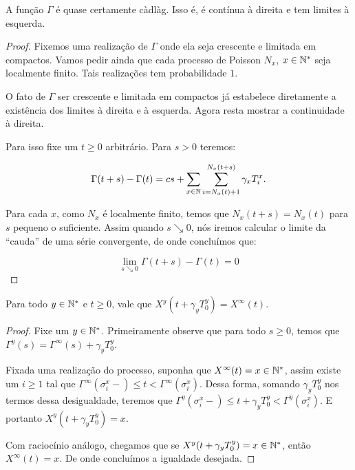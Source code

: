 \begin{proposicao}
  \label{prop:gamma-cadlag}
  A função $\Gamma$ é quase certamente càdlàg. Isso é, é contínua à
  direita e tem limites à esquerda.
\end{proposicao}
\begin{proof}

  Fixemos uma realização de $\Gamma$ onde ela seja crescente e
  limitada em compactos. Vamos pedir ainda que cada processo de
  Poisson $N_x$, $x \in {\mathbb{N^*}}$ seja localmente finito. Tais realizações
  tem probabilidade $1$.

  O fato de $\Gamma$ ser crescente e limitada em compactos já
  estabelece diretamente a existência dos limites à direita e à
  esquerda. Agora resta mostrar a continuidade à direita.

  Para isso fixe um $t \geq 0$ arbitrário. Para $s > 0$ teremos:

  \begin{equation*}
    \Gamma(t+s) - \Gamma(t) = 
    c s + 
    \sum_{x \in {\mathbb{N}}} \sum_{i = N_x(t)+1}^{N_x(t+s)} \gamma_x T^x_i.
  \end{equation*}

  Para cada $x$, como $N_x$ é localmente finito, temos que $N_x(t+s) =
  N_x(t)$ para $s$ pequeno o suficiente. Assim quando $s \searrow 0$,
  nós iremos calcular o limite da ``cauda'' de uma série convergente,
  de onde concluímos que:

  \begin{displaymath}
    \lim_{s \searrow 0} \Gamma(t+s) - \Gamma(t) = 0
  \end{displaymath}
\end{proof}


\begin{proposicao}
  \label{prop:reinicia-infinito}
  Para todo $y \in {\mathbb{N^*}}$ e $t \geq 0$, vale que
  $X^y(t + \gamma_y T_0^y) = X^\infty(t)$.
\end{proposicao}
\begin{proof}
  Fixe um $y \in {\mathbb{N^*}}$. Primeiramente observe que para todo $s \geq 0$,
  temos que $\Gamma^y(s) = \Gamma^\infty(s) + \gamma_yT^y_0$.

  Fixada uma realização do processo, suponha que $X^\infty(t) = x \in
  {\mathbb{N^*}}$, assim existe um $i \geq 1$ tal que $\Gamma^\infty(\sigma_i^x-)
  \leq t < \Gamma^\infty(\sigma_i^x)$. Dessa forma, somando $\gamma_y
  T^y_0$ nos termos dessa desigualdade, teremos que
  $\Gamma^y(\sigma_i^x-) \leq t+\gamma_yT_0^y <
  \Gamma^y(\sigma_i^x)$. E portanto $X^y(t+\gamma_y T_0^y) = x$.

  Com raciocínio análogo, chegamos que se $X^y(t+\gamma_y T_0^y) = x
  \in {\mathbb{N^*}}$, então $X^\infty(t) = x$. De onde concluímos a igualdade desejada.
\end{proof}


